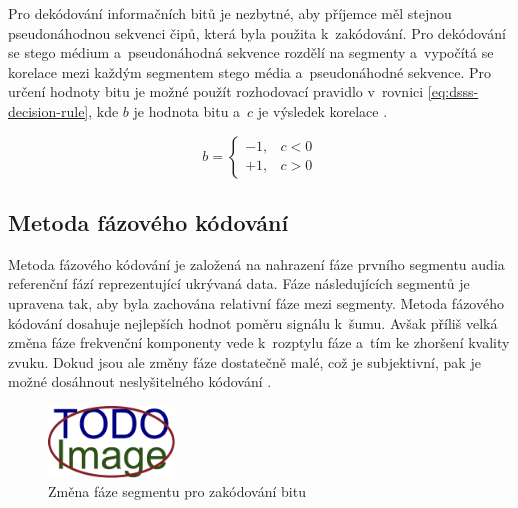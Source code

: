 
Pro dekódování informačních bitů je nezbytné, aby příjemce měl stejnou
pseudonáhodnou sekvenci čipů, která byla použita k~zakódování. Pro dekódování
se stego médium a~pseudonáhodná sekvence rozdělí na segmenty a~vypočítá
se korelace mezi každým segmentem stego média a~pseudonáhodné sekvence. Pro
určení hodnoty bitu je možné použít rozhodovací pravidlo v~rovnici
\ref{eq:dsss-decision-rule}, kde $b$ je hodnota bitu a~$c$ je výsledek korelace
\cite{Kuznetsov2022}.

\begin{equation}
    \label{eq:dsss-decision-rule}
    b = \left\{
        \begin{array}{rl}
            -1, & c < 0 \\
            +1, & c > 0
        \end{array}
    \right.
\end{equation}

\subsection*{Metoda fázového kódování}
\label{sub:phase-coding}

Metoda fázového kódování je založená na nahrazení fáze prvního segmentu audia
referenční fází reprezentující ukrývaná data. Fáze následujících segmentů je
upravena tak, aby byla zachována relativní fáze mezi segmenty. Metoda fázového
kódování dosahuje nejlepších hodnot poměru signálu k~šumu. Avšak příliš velká
změna fáze frekvenční komponenty vede k~rozptylu fáze a~tím ke zhoršení kvality
zvuku. Dokud jsou ale změny fáze dostatečně malé, což je subjektivní, pak je
možné dosáhnout neslyšitelného kódování \cite{Bender1996}.

\begin{figure}[hbt]
    \centering
    \includegraphics[width=0.3\textwidth]{obrazky/placeholder.pdf}
    \caption{Změna fáze segmentu pro zakódování bitu}
    \label{pic:phase-coding-phase-change}
\end{figure}

